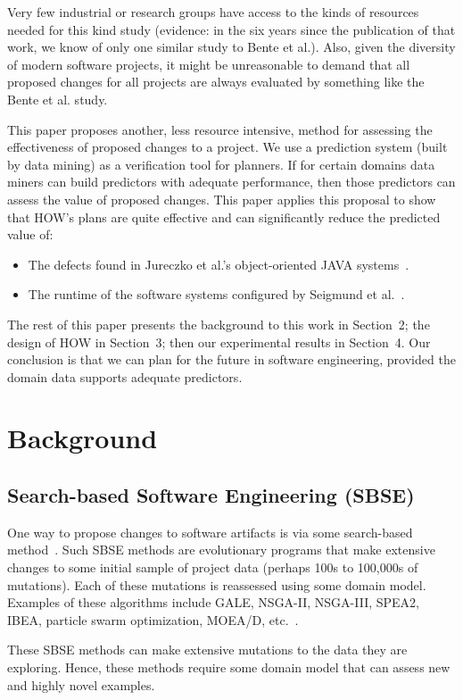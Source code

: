 \documentclass[conference]{IEEEtran}
\newcommand{\bi}{\begin{itemize}}
\newcommand{\ei}{\end{itemize}}
\begin{document}
Very few industrial or research groups have access
to the kinds of resources needed for this kind study  (evidence: in the six years since the
publication of that work, we know of only one   similar study to Bente et al.). Also, given the
diversity of modern software projects, it might be unreasonable to demand that all
proposed changes for all projects are always evaluated by something like the Bente et al. study.

This paper proposes another, less resource intensive,  method for assessing the effectiveness of proposed
changes to a project.  
We  use a prediction system (built by data mining) as a verification
tool for planners. If for certain domains data miners can build
predictors with adequate performance, then those predictors can assess the value
of proposed changes.
This paper applies this proposal to show that   HOW's plans are quite effective and  can
 significantly reduce the  predicted
value of:
\bi
\item The  defects found  in Jureczko et al.'s    object-oriented JAVA systems~\cite{jureczko10}.
\item The runtime of the  software systems   configured by  Seigmund et al.~\cite{sven12}.
\ei 
The rest of this paper presents the background to this work in Section~2; the design of HOW in Section~3;
then our experimental results  in Section~4.  Our conclusion is that we can plan for the future in
software engineering, provided the domain data supports adequate predictors.


\section{Background}
\subsection{Search-based Software Engineering (SBSE)}
One way to propose changes to software artifacts
is   via some search-based method~\cite{Harman2009,Harman2011}. Such SBSE methods are   evolutionary programs that 
make
 extensive changes to  some initial sample of project data
 (perhaps 
100s to 100,000s of mutations). Each of these mutations
is reassessed using some domain model.
Examples of these algorithms include GALE, NSGA-II, NSGA-III, SPEA2, IBEA, particle swarm optimization, MOEA/D, etc.~\cite{krall14,deb00a,zit02,zit04,%
deb14,Cui2005a,zhang07:TEC}.


These SBSE methods can make extensive mutations to the data they are exploring. Hence, these methods
require some domain model that can assess new and highly novel examples.
 
\end{document}
